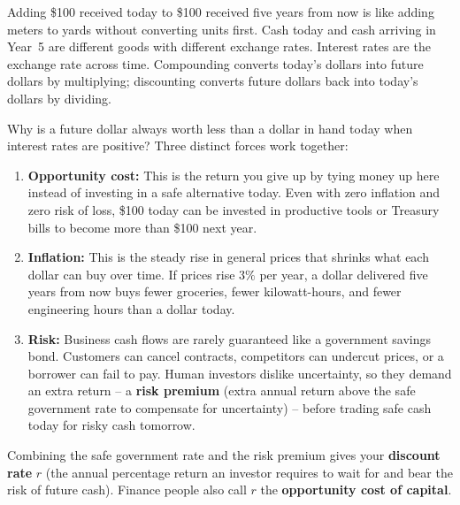 \begin{intuitionbox}
Adding \$100 received today to \$100 received five years from now is like adding meters to yards without converting units first. Cash today and cash arriving in Year~5 are different goods with different exchange rates. Interest rates are the exchange rate across time. Compounding converts today's dollars into future dollars by multiplying; discounting converts future dollars back into today's dollars by dividing.
\end{intuitionbox}

Why is a future dollar always worth less than a dollar in hand today when interest rates are positive? Three distinct forces work together:
\begin{enumerate}
 \item \textbf{Opportunity cost:} This is the return you give up by tying money up here instead of investing in a safe alternative today. Even with zero inflation and zero risk of loss, \$100 today can be invested in productive tools or Treasury bills to become more than \$100 next year.
 \item \textbf{Inflation:} This is the steady rise in general prices that shrinks what each dollar can buy over time. If prices rise $3\%$ per year, a dollar delivered five years from now buys fewer groceries, fewer kilowatt-hours, and fewer engineering hours than a dollar today.
 \item \textbf{Risk:} Business cash flows are rarely guaranteed like a government savings bond. Customers can cancel contracts, competitors can undercut prices, or a borrower can fail to pay. Human investors dislike uncertainty, so they demand an extra return -- a \textbf{risk premium} (extra annual return above the safe government rate to compensate for uncertainty) -- before trading safe cash today for risky cash tomorrow.
\end{enumerate}

Combining the safe government rate and the risk premium gives your \textbf{discount rate} $r$ (the annual percentage return an investor requires to wait for and bear the risk of future cash). Finance people also call $r$ the \textbf{opportunity cost of capital}.

